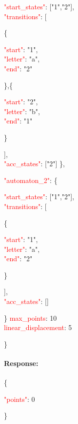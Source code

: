     \begin{adjustwidth}{7.5 mm}{0 cm}
     \begin{adjustwidth}{7.5 mm}{0 cm}
        \textcolor{red}{"start\_states"}: ["1","2"], \\
        \textcolor{red}{"transitions"}: [
        \begin{adjustwidth}{7.5 mm}{0 cm}
          \{
            \begin{adjustwidth}{7.5 mm}{0 cm}
            \textcolor{red}{"start"}: "1", \\
            \textcolor{red}{"letter"}: "a", \\
            \textcolor{red}{"end"}: "2" 
            \end{adjustwidth}
          \},\{ 
            \begin{adjustwidth}{7.5 mm}{0 cm}
            \textcolor{red}{"start"}: "2",\\
            \textcolor{red}{"letter"}: "b", \\
            \textcolor{red}{"end"}: "1"
            \end{adjustwidth}
          \}
        \end{adjustwidth}
        ],\\
        \textcolor{red}{"acc\_states"}: ["2"]
        \},
    \end{adjustwidth}
  \textcolor{red}{"automaton\_2"}: \{
  \begin{adjustwidth}{7.5 mm}{0 cm}
    \textcolor{red}{"start\_states"}: ["1","2"], \\
    \textcolor{red}{"transitions"}: [
    \begin{adjustwidth}{7.5 mm}{0 cm}
      \{
        \begin{adjustwidth}{7.5 mm}{0 cm}
        \textcolor{red}{"start"}: "1",\\
        \textcolor{red}{"letter"}: "a",\\
        \textcolor{red}{"end"}: "2"
        \end{adjustwidth}
      \}\\
      \end{adjustwidth}
    ],\\
    \textcolor{red}{"acc\_states"}: []
    \end{adjustwidth}
  \}
  \textcolor{red}{max\_points}: 10 \\
  \textcolor{red}{linear\_displacement}: 5
  \end{adjustwidth}
     \} \\
     \ \\
\textbf{Response:}\\
\ \\
\{
    \begin{adjustwidth}{7.5 mm}{0 cm}
    \textcolor{red}{"points"}: 0
    \end{adjustwidth}
\}

